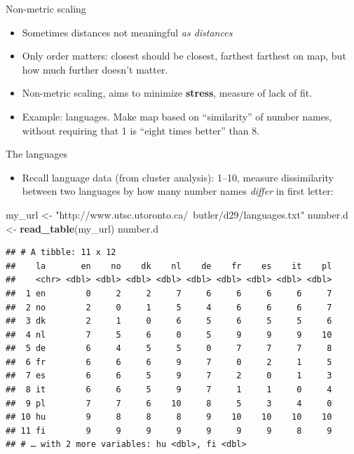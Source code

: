 \documentclass[ignorenonframetext,]{beamer}
\newenvironment{Shaded}{\begin{snugshade}}{\end{snugshade}}
\newcommand{\KeywordTok}[1]{\textcolor[rgb]{0.13,0.29,0.53}{\textbf{#1}}}
\newcommand{\NormalTok}[1]{#1}
\newcommand{\StringTok}[1]{\textcolor[rgb]{0.31,0.60,0.02}{#1}}
\providecommand{\tightlist}{%
  \setlength{\itemsep}{0pt}\setlength{\parskip}{0pt}}
\begin{document}
\begin{frame}{Non-metric scaling}
\protect\hypertarget{non-metric-scaling}{}

\begin{itemize}
\item
  Sometimes distances not meaningful \emph{as distances}
\item
  Only order matters: closest should be closest, farthest farthest on
  map, but how much further doesn't matter.
\item
  Non-metric scaling, aims to minimize \textbf{stress}, measure of lack
  of fit.
\item
  Example: languages. Make map based on ``similarity'' of number names,
  without requiring that 1 is ``eight times better'' than 8.
\end{itemize}

\end{frame}

\begin{frame}[fragile]{The languages}
\protect\hypertarget{the-languages}{}

\begin{itemize}
\tightlist
\item
  Recall language data (from cluster analysis): 1--10, measure
  dissimilarity between two languages by how many number names
  \emph{differ} in first letter:
\end{itemize}

\scriptsize

\begin{Shaded}
\begin{Highlighting}[]
\NormalTok{my_url <-}\StringTok{ "http://www.utsc.utoronto.ca/~butler/d29/languages.txt"}
\NormalTok{number.d <-}\StringTok{ }\KeywordTok{read_table}\NormalTok{(my_url)}
\NormalTok{number.d}
\end{Highlighting}
\end{Shaded}

\begin{verbatim}
## # A tibble: 11 x 12
##    la       en    no    dk    nl    de    fr    es    it    pl
##    <chr> <dbl> <dbl> <dbl> <dbl> <dbl> <dbl> <dbl> <dbl> <dbl>
##  1 en        0     2     2     7     6     6     6     6     7
##  2 no        2     0     1     5     4     6     6     6     7
##  3 dk        2     1     0     6     5     6     5     5     6
##  4 nl        7     5     6     0     5     9     9     9    10
##  5 de        6     4     5     5     0     7     7     7     8
##  6 fr        6     6     6     9     7     0     2     1     5
##  7 es        6     6     5     9     7     2     0     1     3
##  8 it        6     6     5     9     7     1     1     0     4
##  9 pl        7     7     6    10     8     5     3     4     0
## 10 hu        9     8     8     8     9    10    10    10    10
## 11 fi        9     9     9     9     9     9     9     8     9
## # … with 2 more variables: hu <dbl>, fi <dbl>
\end{verbatim}

\normalsize

\end{frame}
\end{document}
